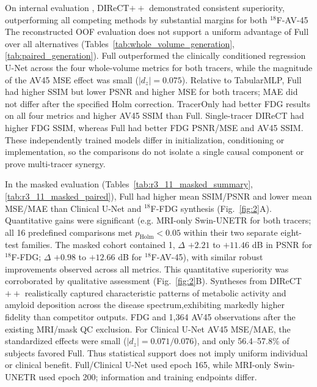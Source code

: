 \documentclass{article}
\providecommand{\DIFaddtex}[1]{{\protect\color{blue} \sf #1}} %
\providecommand{\DIFdeltex}[1]{{\protect\color{red} \scriptsize #1}} %
\providecommand{\DIFaddbegin}{} %
\providecommand{\DIFaddend}{} %
\providecommand{\DIFdelbegin}{} %
\providecommand{\DIFdelend}{} %
\providecommand{\DIFadd}[1]{\texorpdfstring{\DIFaddtex{#1}}{#1}} %
\providecommand{\DIFdel}[1]{\texorpdfstring{\DIFdeltex{#1}}{}} %
\newcommand{\DIFscaledelfig}{0.5}
\newlength{\DIFdelgraphicswidth} %
\newlength{\DIFdelgraphicsheight} %
\newcommand{\DIFaddincludegraphics}[2][]{{\color{blue}\fbox{\DIFOincludegraphics[#1]{#2}}}} %
\newcommand{\DIFdelincludegraphics}[2][]{%
\sbox{\DIFdelgraphicsbox}{\DIFOincludegraphics[#1]{#2}}%
\settoboxwidth{\DIFdelgraphicswidth}{\DIFdelgraphicsbox} %
\settoboxtotalheight{\DIFdelgraphicsheight}{\DIFdelgraphicsbox} %
\scalebox{\DIFscaledelfig}{%
\parbox[b]{\DIFdelgraphicswidth}{\usebox{\DIFdelgraphicsbox}\\[-\baselineskip] \rule{\DIFdelgraphicswidth}{0em}}\llap{\resizebox{\DIFdelgraphicswidth}{\DIFdelgraphicsheight}{%
\setlength{\unitlength}{\DIFdelgraphicswidth}%
\begin{picture}(1,1)%
\thicklines\linethickness{2pt} %
{\color[rgb]{1,0,0}\put(0,0){\framebox(1,1){}}}%
{\color[rgb]{1,0,0}\put(0,0){\line( 1,1){1}}}%
{\color[rgb]{1,0,0}\put(0,1){\line(1,-1){1}}}%
\end{picture}%
}\hspace*{3pt}}} %
} %
\DeclareRobustCommand{\DIFaddbegin}{\DIFOaddbegin \let\includegraphics\DIFaddincludegraphics} %
\DeclareRobustCommand{\DIFaddend}{\DIFOaddend \let\includegraphics\DIFOincludegraphics} %
\DeclareRobustCommand{\DIFdelbegin}{\DIFOdelbegin \let\includegraphics\DIFdelincludegraphics} %
\DeclareRobustCommand{\DIFdelend}{\DIFOaddend \let\includegraphics\DIFOincludegraphics} %
\begin{document}
\DIFdelbegin \DIFdel{On internal evaluation , DIReCT$++$ demonstrated consistent superiority, outperforming all competing methods by substantial margins for both $^{18}$F-AV-45 }\DIFdelend \DIFaddbegin \DIFadd{The reconstructed OOF evaluation does not support a uniform advantage of Full over all alternatives (Tables~\ref{tab:whole_volume_generation},\ref{tab:paired_generation}). Full outperformed the clinically conditioned regression U-Net across the four whole-volume metrics for both tracers, while the magnitude of the AV45 MSE effect was small ($|d_z|=0.075$). Relative to TabularMLP, Full had higher SSIM but lower PSNR and higher MSE for both tracers; MAE did not differ after the specified Holm correction. TracerOnly had better FDG results on all four metrics and higher AV45 SSIM than Full. Single-tracer DIReCT had higher FDG SSIM, whereas Full had better FDG PSNR/MSE and AV45 SSIM. These independently trained models differ in initialization, conditioning or implementation, so the comparisons do not isolate a single causal component or prove multi-tracer synergy.
}

\DIFadd{In the masked evaluation (Tables~\ref{tab:r3_11_masked_summary},\ref{tab:r3_11_masked_paired}), Full had higher mean SSIM/PSNR and lower mean MSE/MAE than Clinical U-Net }\DIFaddend and \DIFdelbegin \DIFdel{$^{18}$F-FDG synthesis (Fig.~\ref{fig:2}A). Quantitative gains were significant (e.g. }\DIFdelend \DIFaddbegin \DIFadd{MRI-only Swin-UNETR for both tracers; all 16 predefined comparisons met $p_{\mathrm{Holm}}<0.05$ within their two separate eight-test families. The masked cohort contained 1}\DIFaddend ,\DIFdelbegin \DIFdel{$\Delta$ $+2.21$ to $+11.46$ dB in PSNR for $^{18}$F-FDG; $\Delta$ $+0.98$  to $+12.66$ dB for $^{18}$F-AV-45), with similar robust improvements observed across all metrics. This quantitative superiority was corroborated by qualitative assessment (Fig.~\ref{fig:2}B). Syntheses from DIReCT $++$ realistically captured characteristic patterns of metabolic activity and amyloid deposition across the disease spectrum,exhibiting markedly higher fidelity than competitor outputs. }\DIFdelend \DIFaddbegin \DIFadd{597 FDG and 1,364 AV45 observations after the existing MRI/mask QC exclusion. For Clinical U-Net AV45 MSE/MAE, the standardized effects were small ($|d_z|=0.071/0.076$), and only 56.4--57.8\% of subjects favored Full. Thus statistical support does not imply uniform individual or clinical benefit. Full/Clinical U-Net used epoch 165, while MRI-only Swin-UNETR used epoch 200; information and training endpoints differ.
}\DIFaddend 
\end{document}
